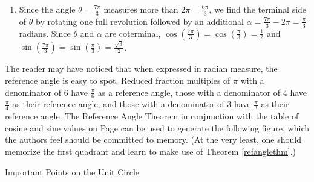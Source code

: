 {\begin{enumerate}
\item  Since the angle $\theta = \frac{7 \pi}{3}$ measures more than $2 \pi = \frac{6 \pi}{3}$, we find the terminal side of $\theta$ by rotating one full revolution followed by an additional $\alpha = \frac{7 \pi}{3} - 2\pi = \frac{\pi}{3}$ radians.  Since $\theta$ and $\alpha$ are coterminal,  $\cos\left(\frac{7\pi}{3}\right) = \cos\left(\frac{\pi}{3}\right) = \frac{1}{2}$ and $\sin\left(\frac{7\pi}{3}\right) = \sin\left(\frac{\pi}{3}\right) = \frac{\sqrt{3}}{2}$.





\end{enumerate}
}

\pagebreak

The reader may have noticed that when expressed in radian measure, the reference angle is easy to spot.  Reduced fraction multiples of $\pi$ with a denominator of $6$ have $\frac{\pi}{6}$ as a reference angle, those with a denominator of $4$ have $\frac{\pi}{4}$ as their reference angle, and those with a denominator of $3$ have $\frac{\pi}{3}$ as their reference angle.  The Reference Angle Theorem in conjunction with the table of cosine and sine values on Page \pageref{CosineSineFacts} can be used to generate the following figure, which the authors feel should be committed to memory. (At the very least, one should memorize the first quadrant and learn to make use of Theorem \ref{refanglethm}.)

\medskip
\noindent\hskip-110pt\begin{minipage}{\textwidth}


\begin{center}
\end{center}
\captionsetup{type=figure}
\caption{Important Points on the Unit Circle}\label{commonanglesunitcircle}
\end{minipage}

\pagebreak




